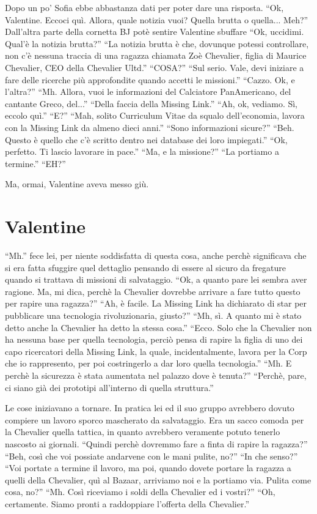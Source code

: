     Dopo un po' Sofia ebbe abbastanza dati per poter dare una risposta. ``Ok, Valentine. Eccoci quì. Allora, quale
    notizia vuoi? Quella brutta o quella... Meh?'' Dall'altra parte della cornetta BJ potè sentire Valentine sbuffare
    ``Ok, uccidimi. Qual'è la notizia brutta?'' ``La notizia brutta è che, dovunque potessi controllare, non c'è nessuna
    traccia di una ragazza chiamata Zoè Chevalier, figlia di Maurice Chevalier, CEO della Chevalier Ultd.'' ``COSA?''
    ``Sul serio. Vale, devi iniziare a fare delle ricerche più approfondite quando accetti le missioni.'' ``Cazzo. Ok, e
    l'altra?'' ``Mh. Allora, vuoi le informazioni del Calciatore PanAmericano, del cantante Greco, del...'' ``Della
    faccia della Missing Link.'' ``Ah, ok, vediamo. Sì, eccolo quì.'' ``E?'' ``Mah, solito Curriculum Vitae da squalo
    dell'economia, lavora con la Missing Link da almeno dieci anni.'' ``Sono informazioni sicure?'' ``Beh. Questo è
    quello che c'è scritto dentro nei database dei loro impiegati.'' ``Ok, perfetto. Ti lascio lavorare in pace.'' ``Ma,
    e la missione?'' ``La portiamo a termine.'' ``EH?''

    Ma, ormai, Valentine aveva messo giù.

  \section*{Valentine}

    ``Mh.'' fece lei, per niente soddisfatta di questa cosa, anche perchè significava che si era fatta sfuggire quel
    dettaglio pensando di essere al sicuro da fregature quando si trattava di missioni di salvataggio. ``Ok, a quanto
    pare lei sembra aver ragione. Ma, mi dica, perchè la Chevalier dovrebbe arrivare a fare tutto questo per rapire una
    ragazza?'' ``Ah, è facile. La Missing Link ha dichiarato di star per pubblicare una tecnologia rivoluzionaria,
    giusto?'' ``Mh, sì. A quanto mi è stato detto anche la Chevalier ha detto la stessa cosa.'' ``Ecco. Solo che la
    Chevalier non ha nessuna base per quella tecnologia, perciò pensa di rapire la figlia di uno dei capo ricercatori
    della Missing Link, la quale, incidentalmente, lavora per la Corp che io rappresento, per poi costringerlo a dar
    loro quella tecnologia.'' ``Mh. E perchè la sicurezza è stata aumentata nel palazzo dove è tenuta?'' ``Perchè, pare,
    ci siano già dei prototipi all'interno di quella struttura.''

    Le cose iniziavano a tornare. In pratica lei ed il suo gruppo avrebbero dovuto compiere un lavoro sporco mascherato
    da salvataggio. Era un sacco comoda per la Chevalier quella tattica, in quanto avrebbero veramente potuto tenerlo
    nascosto ai giornali. ``Quindi perchè dovremmo fare a finta di rapire la ragazza?'' ``Beh, così che voi possiate
    andarvene con le mani pulite, no?'' ``In che senso?'' ``Voi portate a termine il lavoro, ma poi, quando dovete
    portare la ragazza a quelli della Chevalier, quì al Bazaar, arriviamo noi e la portiamo via. Pulita come cosa, no?''
    ``Mh. Così riceviamo i soldi della Chevalier ed i vostri?'' ``Oh, certamente. Siamo pronti a raddoppiare l'offerta
    della Chevalier.''

